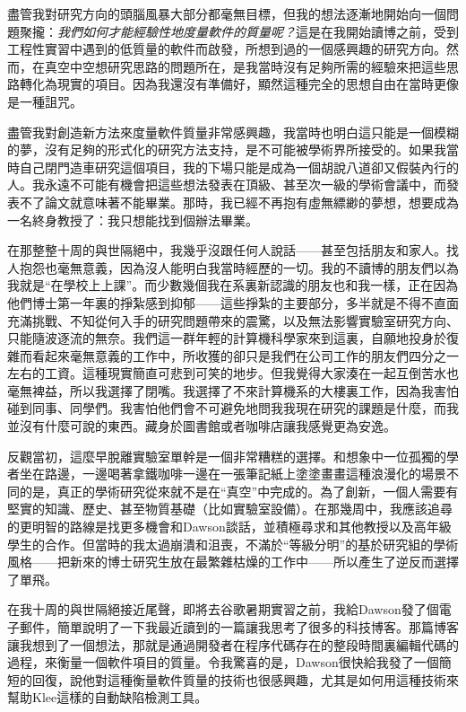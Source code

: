 \documentclass[12pt,UTF8,nofonts]{book}
\begin{document}
盡管我對研究方向的頭腦風暴大部分都毫無目標，但我的想法逐漸地開始向一個問題聚攏：\emph{我們如何才能經驗性地度量軟件的質量呢？}這是在我開始讀博之前，受到工程性實習中遇到的低質量的軟件而啟發，所想到過的一個感興趣的研究方向。然而，在真空中空想研究思路的問題所在，是我當時沒有足夠所需的經驗來把這些思路轉化為現實的項目。因為我還沒有準備好，顯然這種完全的思想自由在當時更像是一種詛咒。

盡管我對創造新方法來度量軟件質量非常感興趣，我當時也明白這只能是一個模糊的夢，沒有足夠的形式化的研究方法支持，是不可能被學術界所接受的。如果我當時自己閉門造車研究這個項目，我的下場只能是成為一個胡說八道卻又假裝內行的人。我永遠不可能有機會把這些想法發表在頂級、甚至次一級的學術會議中，而發表不了論文就意味著不能畢業。那時，我已經不再抱有虛無縹緲的夢想，想要成為一名終身教授了：我只想能找到個辦法畢業。

在那整整十周的與世隔絕中，我幾乎沒跟任何人說話——甚至包括朋友和家人。找人抱怨也毫無意義，因為沒人能明白我當時經歷的一切。我的不讀博的朋友們以為我就是“在學校上上課”。而少數幾個我在系裏新認識的朋友也和我一樣，正在因為他們博士第一年裏的掙紮感到抑郁——這些掙紮的主要部分，多半就是不得不直面充滿挑戰、不知從何入手的研究問題帶來的震驚，以及無法影響實驗室研究方向、只能隨波逐流的無奈。我們這一群年輕的計算機科學家來到這裏，自願地投身於復雜而看起來毫無意義的工作中，所收獲的卻只是我們在公司工作的朋友們四分之一左右的工資。這種現實簡直可悲到可笑的地步。但我覺得大家湊在一起互倒苦水也毫無裨益，所以我選擇了閉嘴。我選擇了不來計算機系的大樓裏工作，因為我害怕碰到同事、同學們。我害怕他們會不可避免地問我我現在研究的課題是什麼，而我並沒有什麼可說的東西。藏身於圖書館或者咖啡店讓我感覺更為安逸。

反觀當初，這麼早脫離實驗室單幹是一個非常糟糕的選擇。和想象中一位孤獨的學者坐在路邊，一邊喝著拿鐵咖啡一邊在一張筆記紙上塗塗畫畫這種浪漫化的場景不同的是，真正的學術研究從來就不是在“真空”中完成的。為了創新，一個人需要有堅實的知識、歷史、甚至物質基礎（比如實驗室設備）。在那幾周中，我應該追尋的更明智的路線是找更多機會和Dawson談話，並積極尋求和其他教授以及高年級學生的合作。但當時的我太過崩潰和沮喪，不滿於“等級分明”的基於研究組的學術風格——把新來的博士研究生放在最繁雜枯燥的工作中——所以產生了逆反而選擇了單飛。

\breakline

在我十周的與世隔絕接近尾聲，即將去谷歌暑期實習之前，我給Dawson發了個電子郵件，簡單說明了一下我最近讀到的一篇讓我思考了很多的科技博客。那篇博客讓我想到了一個想法，那就是通過開發者在程序代碼存在的整段時間裏編輯代碼的過程，來衡量一個軟件項目的質量。令我驚喜的是，Dawson很快給我發了一個簡短的回復，說他對這種衡量軟件質量的技術也很感興趣，尤其是如何用這種技術來幫助Klee這樣的自動缺陷檢測工具。
\end{document}
